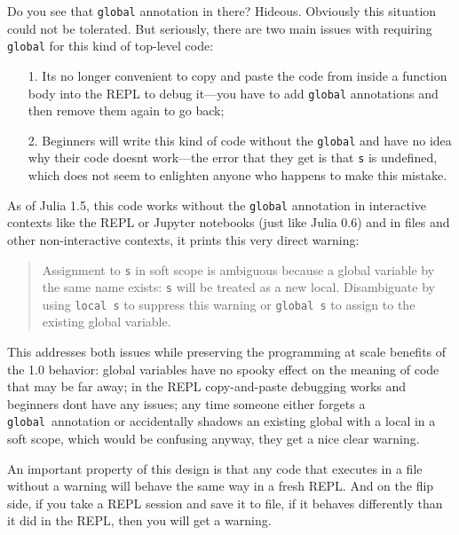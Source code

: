 Do you see that \texttt{global} annotation in there? Hideous. Obviously this situation could not be tolerated. But seriously, there are two main issues with requiring \texttt{global} for this kind of top-level code:



\begin{itemize}
\item[1. ] It{\textquotesingle}s no longer convenient to copy and paste the code from inside a function body into the REPL to debug it—you have to add \texttt{global} annotations and then remove them again to go back;


\item[2. ] Beginners will write this kind of code without the \texttt{global} and have no idea why their code doesn{\textquotesingle}t work—the error that they get is that \texttt{s} is undefined, which does not seem to enlighten anyone who happens to make this mistake.

\end{itemize}


As of Julia 1.5, this code works without the \texttt{global} annotation in interactive contexts like the REPL or Jupyter notebooks (just like Julia 0.6) and in files and other non-interactive contexts, it prints this very direct warning:



\begin{quote}
Assignment to \texttt{s} in soft scope is ambiguous because a global variable by the same name exists: \texttt{s} will be treated as a new local. Disambiguate by using \texttt{local s} to suppress this warning or \texttt{global s} to assign to the existing global variable.

\end{quote}


This addresses both issues while preserving the {\textquotedbl}programming at scale{\textquotedbl} benefits of the 1.0 behavior: global variables have no spooky effect on the meaning of code that may be far away; in the REPL copy-and-paste debugging works and beginners don{\textquotesingle}t have any issues; any time someone either forgets a \texttt{global} annotation or accidentally shadows an existing global with a local in a soft scope, which would be confusing anyway, they get a nice clear warning.



An important property of this design is that any code that executes in a file without a warning will behave the same way in a fresh REPL. And on the flip side, if you take a REPL session and save it to file, if it behaves differently than it did in the REPL, then you will get a warning.



